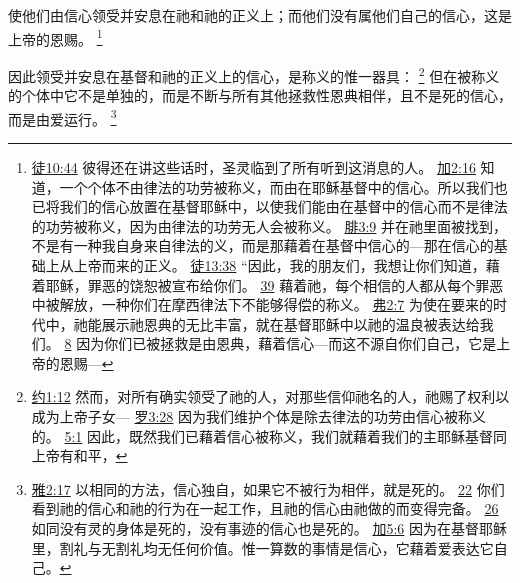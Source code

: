 \documentclass[12pt, a4paper, oneside]{ctexart}
\newcounter{parnum}[section]
\newcommand{\N}{%
   \noindent\refstepcounter{parnum}%
    \makebox[\parindent][l]{\textbf{\arabic{parnum}.}}}
\begin{document}
	使他们由信心领受并安息在祂和祂的正义上；而他们没有属他们自己的信心，这是上帝的恩赐。
	\footnote {
		\href{https://biblehub.com/acts/10-44.htm}{徒10:44} 彼得还在讲这些话时，圣灵临到了所有听到这消息的人。
		\href{https://biblehub.com/galatians/2-16.htm}{加2:16} 知道，一个个体不由律法的功劳被称义，而由在耶稣基督中的信心。所以我们也已将我们的信心放置在基督耶稣中，以使我们能由在基督中的信心而不是律法的功劳被称义，因为由律法的功劳无人会被称义。
		\href{https://biblehub.com/philippians/3-9.htm}{腓3:9} 并在祂里面被找到，不是有一种我自身来自律法的义，而是那藉着在基督中信心的---那在信心的基础上从上帝而来的正义。
		\href{https://biblehub.com/acts/13-38.htm}{徒13:38} “因此，我的朋友们，我想让你们知道，藉着耶稣，罪恶的饶恕被宣布给你们。
		\href{https://biblehub.com/acts/13-39.htm}{39} 藉着祂，每个相信的人都从每个罪恶中被解放，一种你们在摩西律法下不能够得偿的称义。
		\href{https://biblehub.com/ephesians/2-7.htm}{弗2:7} 为使在要来的时代中，祂能展示祂恩典的无比丰富，就在基督耶稣中以祂的温良被表达给我们。
		\href{https://biblehub.com/ephesians/2-8.htm}{8} 因为你们已被拯救是由恩典，藉着信心---而这不源自你们自己，它是上帝的恩赐---
	}

\N 因此领受并安息在基督和祂的正义上的信心，是称义的惟一器具：
	\footnote {
		\href{https://biblehub.com/john/1-12.htm}{约1:12} 然而，对所有确实领受了祂的人，对那些信仰祂名的人，祂赐了权利以成为上帝子女---
		\href{https://biblehub.com/romans/3-28.htm}{罗3:28} 因为我们维护个体是除去律法的功劳由信心被称义的。
        \href{https://biblehub.com/romans/5-1.htm}{5:1} 因此，既然我们已藉着信心被称义，我们就藉着我们的主耶稣基督同上帝有和平，
	}
	但在被称义的个体中它不是单独的，而是不断与所有其他拯救性恩典相伴，且不是死的信心，而是由爱运行。
	\footnote {
		\href{https://biblehub.com/james/2-17.htm}{雅2:17} 以相同的方法，信心独自，如果它不被行为相伴，就是死的。
		\href{https://biblehub.com/james/2-22.htm}{22} 你们看到祂的信心和祂的行为在一起工作，且祂的信心由祂做的而变得完备。
		\href{https://biblehub.com/james/2-26.htm}{26} 如同没有灵的身体是死的，没有事迹的信心也是死的。
		\href{https://biblehub.com/galatians/5-6.htm}{加5:6} 因为在基督耶稣里，割礼与无割礼均无任何价值。惟一算数的事情是信心，它藉着爱表达它自己。
	}
\end{document}
